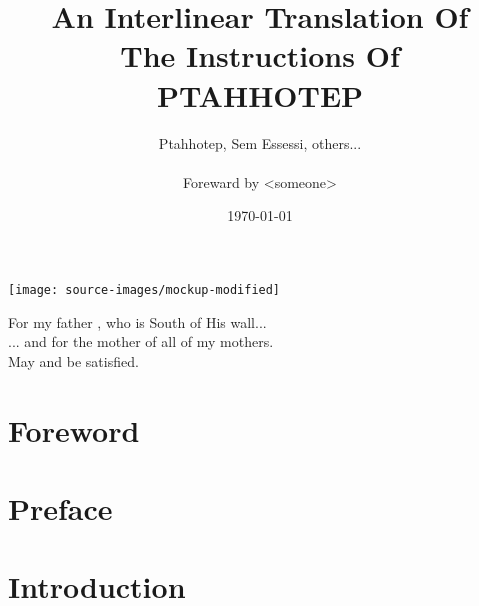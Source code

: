 \documentclass[a4paper,pagesize,8pt,pointlessnumbers,normalheadings,oneside]{book}
\title{
	\small An Interlinear Translation Of\\
	\vspace{2mm}
	\large The Instructions Of\\
	\huge \textbf{PTAHHOTEP}}
\author{Ptahhotep, Sem Essessi, others...\\\\Foreward by <someone>}
\date{\today}
\begin{document}
\maketitle

\vspace*{\fill}
\begin{center}
\texttt{[image: source-images/mockup-modified]}
\end{center}
\vspace*{\fill}
\pagebreak

\vspace*{\fill}
\begin{center}
For my father , who is South of His wall...\\
\vspace{7.5mm}
... and for  the mother of all of my mothers.\\
\vspace{15mm}
May  and  be satisfied.\\
\end{center}
\vspace*{\fill}

\tableofcontents

\markboth{}{}

\newlength\q
\setlength{}

\chapter*{Foreword}

\markboth{}{}

\chapter*{Preface}

\markboth{}{}

\chapter*{Introduction}


\pagebreak

\printindex
\end{document}
